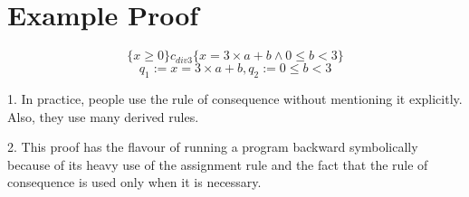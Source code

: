 \documentclass{report}[12pt]
\begin{document}
\section{Example Proof}
{\centering \small
\[\{x\ge 0\} c_{div3} \{x=3\times a + b \wedge 0 \le b < 3\}\]
\[q_1:= x=3\times a + b, q_2 := 0 \le b < 3\]

\vspace{1cm}

\begin{prooftree}
\end{prooftree}

\vspace{1cm}

\scriptsize
\begin{prooftree}
\end{prooftree}

\vspace{1cm}

\normalsize
\begin{prooftree}
\end{prooftree}\par
}

1. In practice, people use the rule of consequence without mentioning it explicitly. Also, they use many derived rules.

2. This proof has the flavour of running a program backward symbolically because of its heavy use of the assignment rule and the fact that the rule of consequence is used only when it is necessary.
\end{document}
